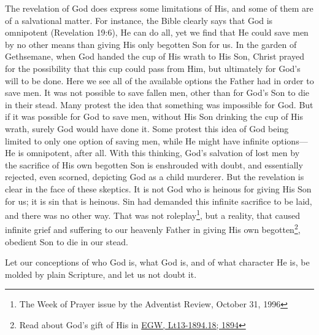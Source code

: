 The revelation of God does express some limitations of His, and some of them are of a salvational matter. For instance, the Bible clearly says that God is omnipotent (Revelation 19:6), He can do all, yet we find that He could save men by no other means than giving His only begotten Son for us. In the garden of Gethsemane, when God handed the cup of His wrath to His Son, Christ prayed for the possibility that this cup could pass from Him, but ultimately for God's will to be done. Here we see all of the available options the Father had in order to save men. It was not possible to save fallen men, other than for God’s Son to die in their stead. Many protest the idea that something was impossible for God. But if it was possible for God to save men, without His Son drinking the cup of His wrath, surely God would have done it. Some protest this idea of God being limited to only one option of saving men, while He might have infinite options—He is omnipotent, after all. With this thinking, God’s salvation of lost men by the sacrifice of His own begotten Son is enshrouded with doubt, and essentially rejected, even scorned, depicting God as a child murderer. But the revelation is clear in the face of these skeptics. It is not God who is heinous for giving His Son for us; it is sin that is heinous. Sin had demanded this infinite sacrifice to be laid, and there was no other way. That was not roleplay\footnote{The Week of Prayer issue by the Adventist Review, October 31, 1996}, but a reality, that caused infinite grief and suffering to our heavenly Father in giving His own begotten\footnote{Read about God’s gift of His  in \href{https://egwwritings.org/?ref=en_Lt13-1894.18&para=5486.24}{{EGW, Lt13-1894.18; 1894}}}, obedient Son to die in our stead.

Let our conceptions of who God is, what God is, and of what character He is, be molded by plain Scripture, and let us not doubt it. 